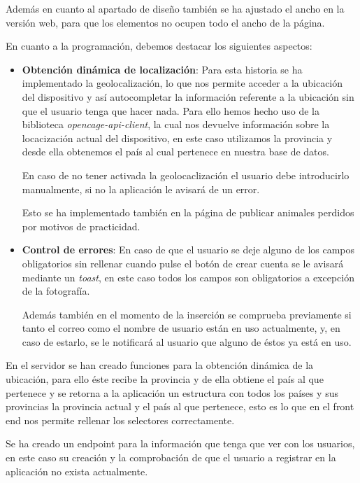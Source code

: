 Además en cuanto al apartado de diseño también se ha ajustado el ancho en la versión web, para que los elementos no ocupen todo el ancho de la página.

En cuanto a la programación, debemos destacar los siguientes aspectos:

\begin{itemize}
	\item \textbf{Obtención dinámica de localización}: Para esta historia se ha implementado la geolocalización, lo que nos permite acceder a la ubicación del dispositivo y así autocompletar la información referente a la ubicación sin que el usuario tenga que hacer nada. Para ello hemos hecho uso de la biblioteca \textit{opencage-api-client}, la cual nos devuelve información sobre la locacización actual del dispositivo, en este caso utilizamos la provincia y desde ella obtenemos el país al cual pertenece en nuestra base de datos. 
	
	En caso de no tener activada la geolocaclización el usuario debe introducirlo manualmente, si no la aplicación le avisará de un error.
	
	Esto se ha implementado también en la página de publicar animales perdidos por motivos de practicidad.
	

	\item \textbf{Control de errores}: En caso de que el usuario se deje alguno de los campos obligatorios sin rellenar cuando pulse el botón de crear cuenta se le avisará mediante un \textit{toast}, en este caso todos los campos son obligatorios a excepción de la fotografía.
	
	Además también en el momento de la inserción se comprueba previamente si tanto el correo como el nombre de usuario están en uso actualmente, y, en caso de estarlo, se le notificará al usuario que alguno de éstos ya está en uso.
\end{itemize}

En el servidor se han creado funciones para la obtención dinámica de la ubicación, para ello éste recibe la provincia y de ella obtiene el país al que pertenece y se retorna a la aplicación un estructura con todos los países y sus provincias la provincia actual y el país al que pertenece, esto es lo que en el front end nos permite rellenar los selectores correctamente.

Se ha creado un endpoint para la información que tenga que ver con los usuarios, en este caso su creación y la comprobación de que el usuario a registrar en la aplicación no exista actualmente.

